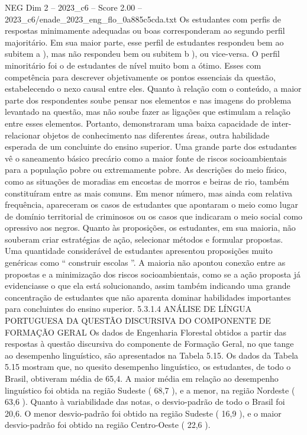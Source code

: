 \begin{textsample}{NEG Dim 2 – 2023\_c6 – Score 2.00 – 2023\_c6/enade\_2023\_eng\_flo\_0a885c5cda.txt}
Os estudantes com perfis de respostas minimamente adequadas ou boas corresponderam ao segundo perfil majoritário.
Em sua maior parte, esse perfil de estudantes respondeu bem ao subitem a ), mas não respondeu bem ou subitem b ), ou vice-versa.
O perfil minoritário foi o de estudantes de nível muito bom a ótimo.
Esses com competência para descrever objetivamente os pontos essenciais da questão, estabelecendo o nexo causal entre eles.
Quanto à relação com o conteúdo, a maior parte dos respondentes soube pensar nos elementos e nas imagens do problema levantado na questão, mas não soube fazer as ligações que estimulam a relação entre esses elementos.
Portanto, demonstraram uma baixa capacidade de inter-relacionar objetos de conhecimento nas diferentes áreas, outra habilidade esperada de um concluinte do ensino superior.
Uma grande parte dos estudantes vê o saneamento básico precário como a maior fonte de riscos socioambientais para a população pobre ou extremamente pobre.
As descrições do meio físico, como as situações de moradias em encostas de morros e beiras de rio, também constituíram entre as mais comuns.
Em menor número, mas ainda com relativa frequência, apareceram os casos de estudantes que apontaram o meio como lugar de domínio territorial de criminosos ou os casos que indicaram o meio social como opressivo aos negros.
Quanto às proposições, os estudantes, em sua maioria, não souberam criar estratégias de ação, selecionar métodos e formular propostas.
Uma quantidade considerável de estudantes apresentou proposições muito genéricas como “ construir escolas ”.
A maioria não apontou conexão entre as propostas e a minimização dos riscos socioambientais, como se a ação proposta já evidenciasse o que ela está solucionando, assim também indicando uma grande concentração de estudantes que não aparenta dominar habilidades importantes para concluintes do ensino superior. 5.3.1.4 ANÁLISE DE LÍNGUA PORTUGUESA DA QUESTÃO DISCURSIVA DO COMPONENTE DE FORMAÇÃO GERAL Os dados de Engenharia Florestal obtidos a partir das respostas à questão discursiva do componente de Formação Geral, no que tange ao desempenho linguístico, são apresentados na Tabela 5.15.
Os dados da Tabela 5.15 mostram que, no quesito desempenho linguístico, os estudantes, de todo o Brasil, obtiveram média de 65,4.
A maior média em relação ao desempenho linguístico foi obtida na região Sudeste ( 68,7 ), e a menor, na região Nordeste ( 63,6 ).
Quanto à variabilidade das notas, o desvio-padrão de todo o Brasil foi 20,6.
O menor desvio-padrão foi obtido na região Sudeste ( 16,9 ), e o maior desvio-padrão foi obtido na região Centro-Oeste ( 22,6 ).

\end{textsample}
